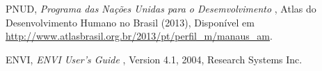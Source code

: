 \begin{thebibliography}{9}





 PNUD, \emph{Programa das Nações Unidas para o Desemvolvimento },  Atlas do Desenvolvimento Humano no Brasil (2013), Disponível em 
\url{http://www.atlasbrasil.org.br/2013/pt/perfil_m/manaus_am}.

 ENVI, \emph{ENVI User’s
Guide
}, Version 4.1, 2004, Research Systems Inc.
\end{thebibliography}